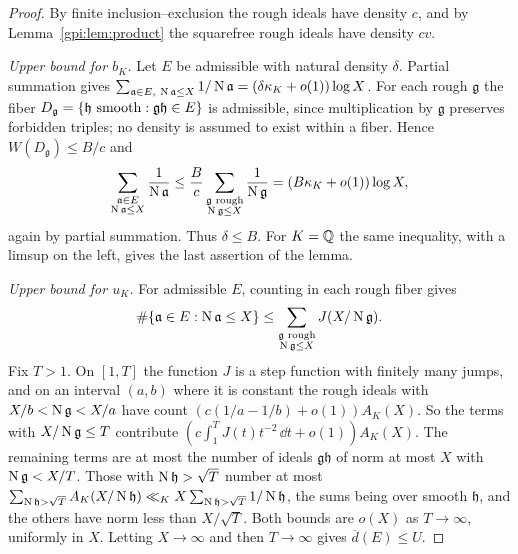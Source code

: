 \begin{proof}
By finite inclusion--exclusion the rough ideals have density $c$, and by
Lemma~\ref{gpi:lem:product} the squarefree rough ideals have density $cv$.

\emph{Upper bound for $b_K$.} Let $E$ be admissible with natural density $\delta$. Partial
summation gives
$\sum_{\mathfrak a\in E,\ \operatorname{N}\mathfrak a\le X}1/\operatorname{N}\mathfrak a=(\delta\kappa_K+o(1))\log X$.
For each rough $\mathfrak g$ the fiber $D_{\mathfrak g}=\{\mathfrak h\text{ smooth}:
\mathfrak g\mathfrak h\in E\}$ is admissible, since multiplication by $\mathfrak g$ preserves
forbidden triples; no density is assumed to exist within a fiber. Hence
$W(D_{\mathfrak g})\le B/c$ and
\[
 \sum_{\substack{\mathfrak a\in E\\ \operatorname{N}\mathfrak a\le X}}\frac1{\operatorname{N}\mathfrak a}
 \le\frac Bc\sum_{\substack{\mathfrak g\text{ rough}\\ \operatorname{N}\mathfrak g\le X}}\frac1{\operatorname{N}\mathfrak g}
 =(B\kappa_K+o(1))\log X ,
\]
again by partial summation. Thus $\delta\le B$. For $K=\mathbb{Q}$ the same inequality, with a limsup
on the left, gives the last assertion of the lemma.

\emph{Upper bound for $u_K$.} For admissible $E$, counting in each rough fiber gives
\[
 \#\{\mathfrak a\in E:\operatorname{N}\mathfrak a\le X\}
 \le\sum_{\substack{\mathfrak g\text{ rough}\\ \operatorname{N}\mathfrak g\le X}}J(X/\operatorname{N}\mathfrak g).
\]
Fix $T>1$. On $[1,T]$ the function $J$ is a step function with finitely many jumps, and on
an interval $(a,b)$ where it is constant the rough ideals with $X/b<\operatorname{N}\mathfrak g<X/a$ have
count $(c(1/a-1/b)+o(1))A_K(X)$. So the terms with $X/\operatorname{N}\mathfrak g\le T$ contribute
$(c\int_1^TJ(t)t^{-2}\,\dd t+o(1))A_K(X)$. The remaining terms are at most the number of
ideals $\mathfrak g\mathfrak h$ of norm at most $X$ with $\operatorname{N}\mathfrak g<X/T$. Those with
$\operatorname{N}\mathfrak h>\sqrt T$ number at most
$\sum_{\operatorname{N}\mathfrak h>\sqrt T}A_K(X/\operatorname{N}\mathfrak h)\ll_KX\sum_{\operatorname{N}\mathfrak h>\sqrt T}1/\operatorname{N}\mathfrak h$,
the sums being over smooth $\mathfrak h$, and the others have norm less than $X/\sqrt T$.
Both bounds are $o(X)$ as $T\to\infty$, uniformly in $X$. Letting $X\to\infty$ and then
$T\to\infty$ gives $\overline d(E)\le U$.


\end{proof}
